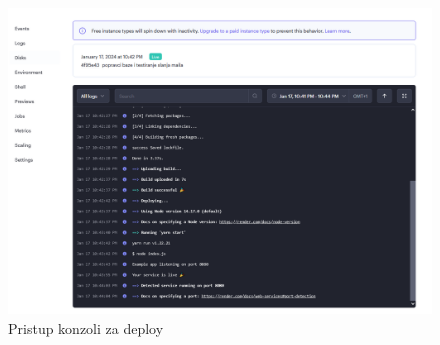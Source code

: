 				\begin{figure}[H]
					\centering
					\includegraphics[width=\textwidth]{slike/render_deploy_status.png}
					\caption{Pristup konzoli za deploy}
					\label{fig: Render deploz console back}
				\end{figure}
			\eject 
